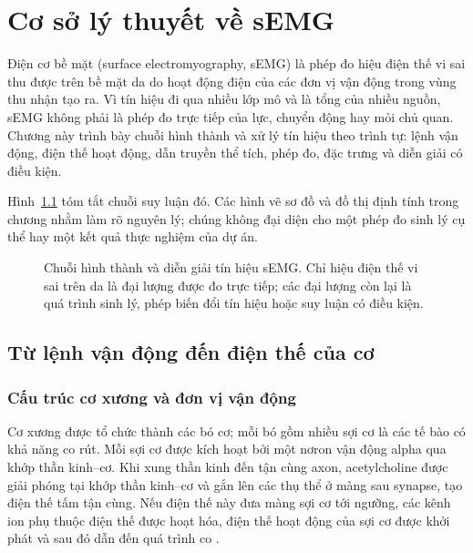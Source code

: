 \chapter{Cơ sở lý thuyết về sEMG}
\label{ch:semg-theory}

Điện cơ bề mặt (surface electromyography, sEMG) là phép đo hiệu điện thế
vi sai thu được trên bề mặt da do hoạt động điện của các đơn vị vận động
trong vùng thu nhận tạo ra. Vì tín hiệu đi qua nhiều lớp mô và là tổng của
nhiều nguồn, sEMG không phải là phép đo trực tiếp của lực, chuyển động hay
mỏi chủ quan. Chương này trình bày chuỗi hình thành và xử lý tín hiệu theo
trình tự: lệnh vận động, điện thế hoạt động, dẫn truyền thể tích, phép đo,
đặc trưng và diễn giải có điều kiện.

Hình~\ref{fig:signal-chain} tóm tắt chuỗi suy luận đó. Các hình vẽ sơ đồ và
đồ thị định tính trong chương nhằm làm rõ nguyên lý; chúng không đại diện
cho một phép đo sinh lý cụ thể hay một kết quả thực nghiệm của dự án.

\begin{figure}[htbp]
    \centering
    
    \caption{Chuỗi hình thành và diễn giải tín hiệu sEMG. Chỉ hiệu điện thế
    vi sai trên da là đại lượng được đo trực tiếp; các đại lượng còn lại là
    quá trình sinh lý, phép biến đổi tín hiệu hoặc suy luận có điều kiện.}
    \label{fig:signal-chain}
\end{figure}

\section{Từ lệnh vận động đến điện thế của cơ}
\label{sec:from-command-to-potential}

\subsection{Cấu trúc cơ xương và đơn vị vận động}
\label{sec:motor-unit}

Cơ xương được tổ chức thành các bó cơ; mỗi bó gồm nhiều sợi cơ là các tế
bào có khả năng co rút. Mỗi sợi cơ được kích hoạt bởi một nơron vận động
alpha qua khớp thần kinh--cơ. Khi xung thần kinh đến tận cùng axon, acetylcholine được giải phóng tại
khớp thần kinh--cơ và gắn lên các thụ thể ở màng sau synapse, tạo điện thế
tấm tận cùng. Nếu điện thế này đưa màng sợi cơ tới ngưỡng, các kênh ion
phụ thuộc điện thế được hoạt hóa, điện thế hoạt động của sợi cơ được khởi
phát và sau đó dẫn đến quá trình co
\cite{mcmanus2020analysis,merletti2004electromyography}.

